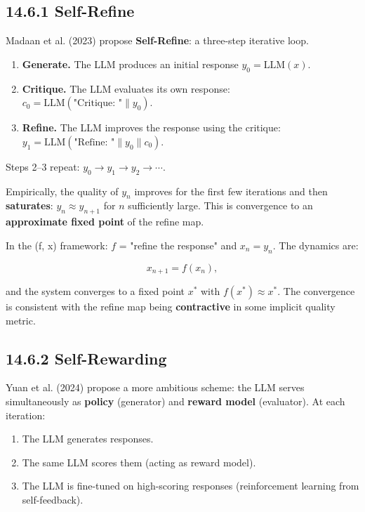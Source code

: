 \subsection{14.6.1 Self-Refine}

Madaan et al. (2023) propose \textbf{Self-Refine}: a three-step iterative loop.

\begin{enumerate}
\item \textbf{Generate.} The LLM produces an initial response $y_0 = \mathrm{LLM}(x)$.
\item \textbf{Critique.} The LLM evaluates its own response: $c_0 = \mathrm{LLM}(\text{"Critique: "} \| y_0)$.
\item \textbf{Refine.} The LLM improves the response using the critique: $y_1 = \mathrm{LLM}(\text{"Refine: "} \| y_0 \| c_0)$.
\end{enumerate}

Steps 2--3 repeat: $y_0 \to y_1 \to y_2 \to \cdots$.

\begin{observation}
Empirically, the quality of $y_n$ improves for the first few iterations and then \textbf{saturates}: $y_n \approx y_{n+1}$ for $n$ sufficiently large. This is convergence to an \textbf{approximate fixed point} of the refine map.

In the (f, x) framework: $f$ = "refine the response" and $x_n = y_n$. The dynamics are:

\[x_{n+1} = f(x_n),\]

and the system converges to a fixed point $x^*$ with $f(x^*) \approx x^*$. The convergence is consistent with the refine map being \textbf{contractive} in some implicit quality metric.
\end{observation}

\subsection{14.6.2 Self-Rewarding}

Yuan et al. (2024) propose a more ambitious scheme: the LLM serves simultaneously as \textbf{policy} (generator) and \textbf{reward model} (evaluator). At each iteration:

\begin{enumerate}
\item The LLM generates responses.
\item The same LLM scores them (acting as reward model).
\item The LLM is fine-tuned on high-scoring responses (reinforcement learning from self-feedback).
\end{enumerate}

